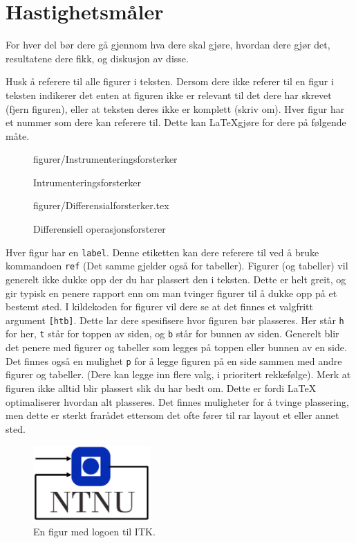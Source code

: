 \section{Hastighetsmåler}
For hver del bør dere gå gjennom hva dere skal gjøre, hvordan dere gjør det, resultatene dere fikk,
og diskusjon av disse. 

Husk å referere til alle figurer i teksten. Dersom dere ikke referer til en 
figur i teksten indikerer det enten at figuren ikke er relevant til det dere
har skrevet (fjern figuren), eller at teksten deres ikke er komplett (skriv om).
Hver figur har et nummer som dere kan referere til. Dette kan \LaTeX gjøre for dere
på følgende måte. 
\begin{figure} [h]
    \centering
     {figurer/Instrumenteringsforsterker}
    \caption{Intrumenteringsforsterker}
    \label{fig:instrumenteringsforsterker}
\end{figure}

\begin{figure} [h]
     {figurer/Differensialforsterker.tex}
    \caption{Differensiell operasjonsforsterer}
    \label{fig:differensialforsterker}
\end{figure}



Hver figur har en \texttt{label}. Denne etiketten kan dere
referere til ved å bruke kommandoen \texttt{ref} (Det samme gjelder også for tabeller).
Figurer (og tabeller) vil generelt ikke dukke opp der du har plassert den i teksten.
Dette er helt greit, og gir typisk en penere rapport enn om man tvinger figurer til å dukke opp på et bestemt sted. I kildekoden for figurer vil dere se at det finnes et
valgfritt argument \verb+[htb]+. Dette lar dere spesifisere hvor figuren bør plasseres. Her står \verb+h+ for her, \verb+t+ står for toppen av siden, og \verb+b+
står for bunnen av siden. Generelt blir det penere med figurer og tabeller som legges på toppen eller bunnen av en side. Det finnes også en mulighet \verb+p+ for å legge figuren på en side sammen med andre figurer og tabeller. (Dere kan legge inn flere valg, i prioritert rekkefølge). Merk at figuren ikke alltid blir plassert slik du har bedt om. Dette er fordi LaTeX optimaliserer hvordan alt plasseres. Det finnes muligheter for å tvinge plassering, men dette er sterkt frarådet ettersom det ofte fører til rar layout et eller annet sted.




\begin{figure}[b]
	\centering
	\includegraphics[width=0.40\textwidth]{figurer/itk_ntnu.jpg}
	\caption{En figur med logoen til ITK.}
\label{fig:layers_openloop}
\end{figure}

